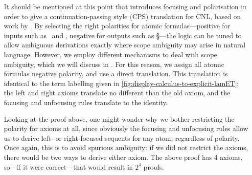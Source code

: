 It should be mentioned at this point that \citet{bastenhof2011}
introduces focusing and polarisation in order to give a
continuation-passing style (CPS) translation for CNL, based on work by
\citet{girard1991}. By selecting the right polarities for atomic
formulas---positive for inputs such as \N\ and \NP, negative for
outputs such as \S---the logic can be tuned to allow ambiguous
derivations exactly where scope ambiguity may arise in natural
language. However, we employ different mechanisms to deal with scope
ambiguity, which we will discuss in . For this reason,
we assign all atomic formulas negative polarity, and use a direct
translation. This translation is identical to the term labelling given
in \autoref{fig:display-calculus-to-explicit-lamET}; the left and
right axioms translate no different than the old axiom, and the
focusing and unfocusing rules translate to the identity.

Looking at the proof above, one might wonder why we bother restricting
the polarity for axioms at all, since obviously the focusing and
unfocusing rules allow us to derive left- or right-focused sequents
for any atom, regardless of polarity. Once again, this is to avoid
spurious ambiguity: if we did not restrict the axioms, there would be
two ways to derive either axiom. The above proof has 4 axioms, so---if
it were correct---that would result in $2^4$ proofs.

